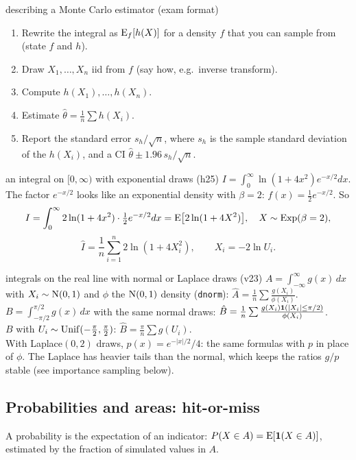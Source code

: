 \begin{algo}{describing a Monte Carlo estimator (exam format)}
\begin{enumerate}
  \item Rewrite the integral as $\mathrm{E}_f[h(X)]$ for a density $f$ that you can sample from (state $f$ and $h$).
  \item Draw $X_1,\dots,X_n$ iid from $f$ (say how, e.g.\ inverse transform).
  \item Compute $h(X_1),\dots,h(X_n)$.
  \item Estimate $\hat\theta = \frac1n\sum h(X_i)$.
  \item Report the standard error $s_h/\sqrt n$, where $s_h$ is the sample standard deviation of the $h(X_i)$, and a CI $\hat\theta\pm1.96\,s_h/\sqrt n$.
\end{enumerate}
\end{algo}

\begin{example}{an integral on $[0,\infty)$ with exponential draws (h25)}
$I = \int_0^\infty\ln(1+4x^2)e^{-x/2}dx$. The factor $e^{-x/2}$ looks like an exponential density with $\beta = 2$: $f(x) = \frac12e^{-x/2}$. So
\[
I = \int_0^\infty 2\ln(1+4x^2)\cdot\tfrac12e^{-x/2}dx = \mathrm{E}\big[2\ln(1+4X^2)\big],\quad X\sim\mathrm{Exp}(\beta=2),
\]
\[
\hat I = \frac1n\sum_{i=1}^n 2\ln(1+4X_i^2), \qquad X_i = -2\ln U_i.
\]
\end{example}

\begin{example}{integrals on the real line with normal or Laplace draws (v23)}
$A = \int_{-\infty}^\infty g(x)\,dx$ with $X_i\sim\mathrm{N}(0,1)$ and $\phi$ the $\mathrm{N}(0,1)$ density (\texttt{dnorm}): $\hat A = \frac1n\sum\frac{g(X_i)}{\phi(X_i)}$.\\
$B = \int_{-\pi/2}^{\pi/2}g(x)\,dx$ with the same normal draws: $\hat B = \frac1n\sum\frac{g(X_i)\mathbf{1}(|X_i|\le\pi/2)}{\phi(X_i)}$.\\
$B$ with $U_i\sim\mathrm{Unif}(-\frac\pi2,\frac\pi2)$: $\hat B = \frac{\pi}{n}\sum g(U_i)$.\\
With Laplace$(0,2)$ draws, $p(x) = e^{-|x|/2}/4$: the same formulas with $p$ in place of $\phi$. The Laplace has heavier tails than the normal, which keeps the ratios $g/p$ stable (see importance sampling below).
\end{example}

\subsection{Probabilities and areas: hit-or-miss}
A probability is the expectation of an indicator: $P(X\in A) = \mathrm{E}[\mathbf{1}(X\in A)]$, estimated by the fraction of simulated values in $A$.

